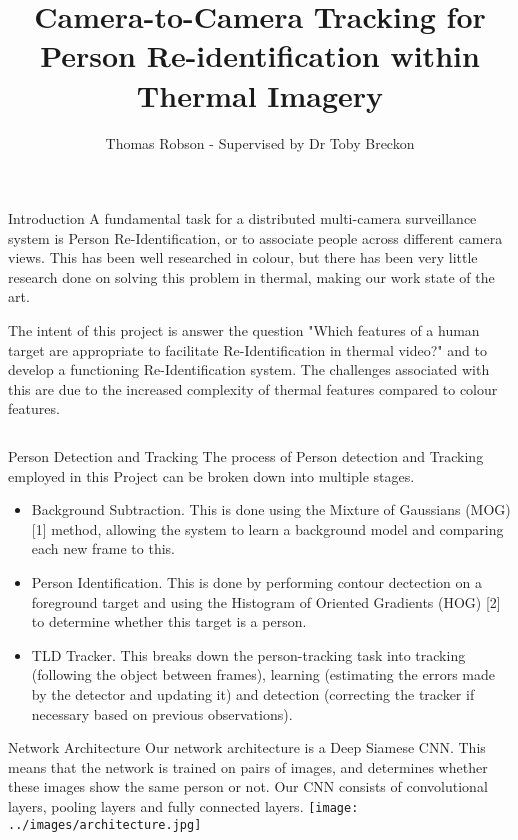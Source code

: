 \documentclass[final]{beamer}
\title[Thermal Re-ID]{Camera-to-Camera Tracking for Person Re-identification within Thermal Imagery}
\author[G Ingram]{Thomas Robson - Supervised by Dr Toby Breckon}
\institute[Durham]{School of Computer Science, Durham University}
\begin{document}
  \begin{frame}{} 

  \vfill
  \begin{block}{Introduction}
          A fundamental task for a distributed multi-camera surveillance system is Person Re-Identification, or to associate people across different camera views. This has been well researched in colour, but there has been very little research done on solving this problem in thermal, making our work state of the art. 

The intent of this project is answer the question "Which features of a human target are appropriate to facilitate Re-Identification in thermal video?" and to develop a functioning Re-Identification system. The challenges associated with this are due to the increased complexity of thermal features compared to colour features.
        \end{block}
        
    \begin{columns}[t]
      \begin{column}{.49\linewidth}
        
        \begin{block}{Person Detection and Tracking}
        	The process of Person detection and Tracking employed in this Project can be broken down into multiple stages. 
        	\begin{itemize}
        	\item Background Subtraction. This is done using the Mixture of Gaussians (MOG) [1] method, allowing the system to learn a background model and comparing each new frame to this. 

        	\item Person Identification. This is done by performing contour dectection on a foreground target and using the Histogram of Oriented Gradients (HOG) [2] to determine whether this target is a person.
        	
        	\item TLD Tracker.  This breaks down the person-tracking task into tracking (following the object between frames), learning (estimating the errors made by the detector and updating it) and detection (correcting the tracker if necessary based on previous observations). 
          \end{itemize}
        \end{block}
       


        \begin{block}{Network Architecture}
        Our network architecture is a Deep Siamese CNN. This means that the network is trained on pairs of images, and determines whether these images show the same person or not. Our CNN consists of convolutional layers, pooling layers and fully connected layers. 
        \texttt{[image: ../images/architecture.jpg]}
        \end{block}
	

\end{column}
\end{columns}
\end{frame}
\end{document}
